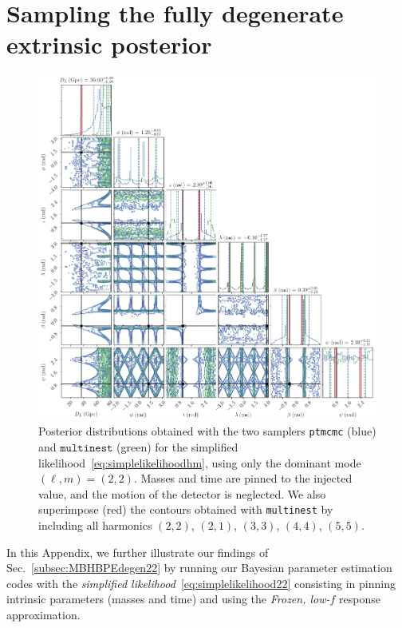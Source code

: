 \documentclass[aps,showpacs,twocolumn,prd,superscriptaddress,nofootinbib]{revtex4-1}
\begin{document}

\section{Sampling the fully degenerate extrinsic posterior}
\label{app:samplingdegen}

\begin{figure}
  \centering
  \includegraphics[width=.9\linewidth]{corner_smbh_case9_simplelike_ptmcmc_bambi.png}
  \caption{Posterior distributions obtained with the two samplers \texttt{ptmcmc} (blue) and $\texttt{multinest}$ (green) for the simplified likelihood~\eqref{eq:simplelikelihoodhm}, using only the dominant mode $(\ell, m) = (2,2)$. Masses and time are pinned to the injected value, and the motion of the detector is neglected. We also superimpose (red) the contours obtained with \texttt{multinest} by including all harmonics $(2,2)$, $(2,1)$, $(3,3)$, $(4,4)$, $(5,5)$.}
  \label{fig:PEsmbh22hmSimpleLikeCase9}
\end{figure}

In this Appendix, we further illustrate our findings of Sec.~\ref{subsec:MBHBPEdegen22} by running our Bayesian parameter estimation codes with the \textit{simplified likelihood}~\eqref{eq:simplelikelihood22} consisting in pinning intrinsic parameters (masses and time) and using the \textit{Frozen, low-$f$} response approximation.
\end{document}
